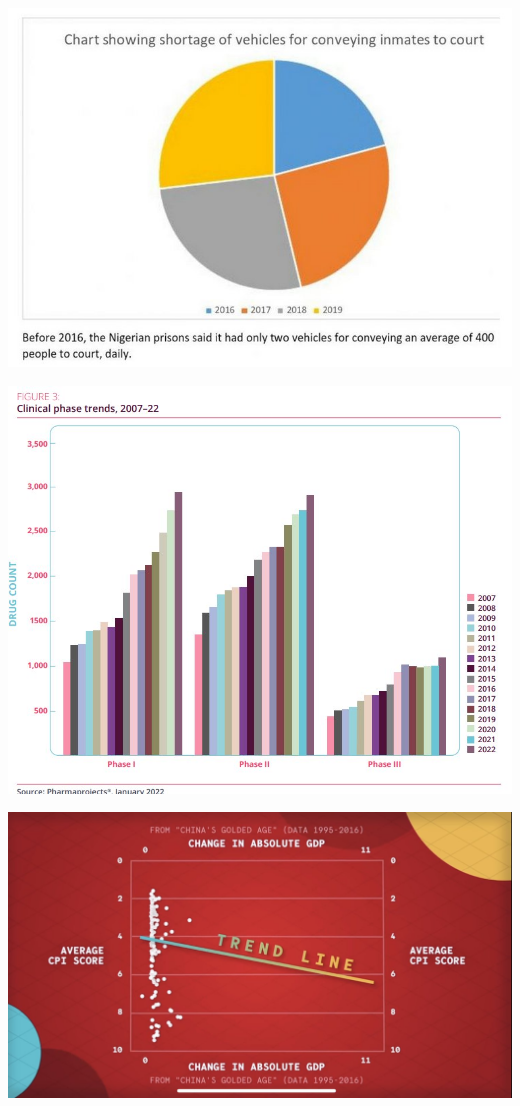 \documentclass{beamer}
\begin{document}
 \begin{frame}\centering\includegraphics[width=\textwidth,keepaspectratio]{graphcrimes/FRSll9GWYAMyYZR.jpeg}\end{frame}
 \begin{frame}\centering\includegraphics[width=\textwidth,keepaspectratio]{graphcrimes/FRUFGM4WUAEq35D.jpeg}\end{frame}
 \begin{frame}\centering\includegraphics[width=\textwidth,keepaspectratio]{graphcrimes/FSiH5AwXoAA8w23.jpeg}\end{frame}
\end{document}
